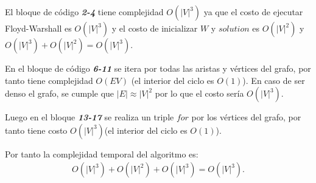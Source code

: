 \documentclass{article}
\begin{document}
El bloque de código \textbf{\textit{2-4}} tiene complejidad $O(|V|^3)$ ya que el costo de ejecutar 
Floyd-Warshall es $O(|V|^3)$ y el costo de inicializar $W$ y $solution$ es 
$O(|V|^2)$ y $O(|V|^3) + O(|V|^2) = O(|V|^3)$. 

En el bloque de código \textbf{\textit{6-11}} se itera por todas las aristas y vértices del grafo, 
por tanto tiene complejidad $O(EV)$ (el interior del ciclo es $O(1)$). En caso de ser denso el grafo, 
se cumple que $|E| \approx |V|^2$ por lo que el costo sería $O(|V|^3)$.

Luego en el bloque \textbf{\textit{13-17}} se realiza un triple $for$ por los vértices del grafo, 
por tanto tiene costo $O(|V|^3)$(el interior del ciclo es $O(1)$).

Por tanto la complejidad temporal del algoritmo es:
\begin{align}
    O(|V|^3) + O(|V|^2) + O(|V|^3) = O(|V|^3).
\end{align}
\end{document}
